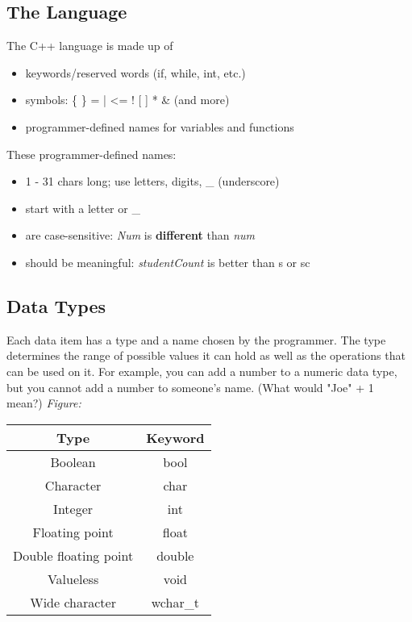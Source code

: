 \documentclass{report}
\begin{document}
    \subsection{The Language}
    \bigbreak \noindent 
    The C++ language is made up of 
    \begin{itemize}
        \item keywords/reserved words (if, while, int, etc.)
        \item symbols: \{ \} =  |  <=  ! [ ]  *  \&  (and more)
        \item programmer-defined names for variables and functions
    \end{itemize}
    \bigbreak \noindent 
    These programmer-defined names:
    \begin{itemize}
        \item  1 - 31 chars long; use letters, digits, \_ (underscore)
        \item start with a letter or \_
        \item are case-sensitive: \textit{Num} is \textbf{different} than \textit{num}
        \item should be meaningful: \textit{studentCount} is better than s or sc
    \end{itemize}

    \bigbreak \noindent \bigbreak \noindent 
    \subsection{Data Types}
    \bigbreak \noindent 
    Each data item has a type and a name chosen by the programmer. The type determines the range of possible values it can hold as well as the operations that can be used on it. For example, you can add a number to a numeric data type, but you cannot add a number to someone's name. (What would "Joe" + 1 mean?)
    \bigbreak \noindent 
    \textit{Figure:}
    \begin{center}
    \begin{tabular}{|c|c|}
        \hline
        Type & Keyword \\
        \hline
        Boolean & bool \\
        Character & char \\
        Integer & int \\
        Floating point & float \\
        Double floating point & double \\
        Valueless & void \\
        Wide character & wchar\_t \\
        \hline
    \end{tabular}
        \end{center}
        \bigbreak \noindent 
        \bigbreak \noindent 
\end{document}
